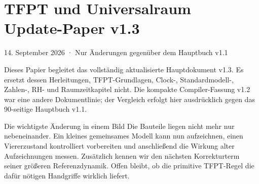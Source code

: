 \documentclass[11pt,a4paper,oneside,parskip=half,headings=normal]{scrreprt}
\begin{document}
\chapter*{TFPT und Universalraum\\Update-Paper v1.3}
\noindent\textsf{14. September 2026 · Nur Änderungen gegenüber dem Hauptbuch v1.1}

Dieses Papier begleitet das vollständig aktualisierte Hauptdokument v1.3. Es ersetzt dessen Herleitungen, TFPT-Grundlagen, Clock-, Standardmodell-, Zahlen-, RH- und Raumzeitkapitel nicht. Die kompakte Compiler-Fassung v1.2 war eine andere Dokumentlinie; der Vergleich erfolgt hier ausdrücklich gegen das 90-seitige Hauptbuch v1.1.

\begin{bild}{Die wichtigste Änderung in einem Bild}
Die Bauteile liegen nicht mehr nur nebeneinander. Ein kleines gemeinsames Modell kann nun aufzeichnen, einen Viererzustand kontrolliert vorbereiten und anschließend die Wirkung alter Aufzeichnungen messen. Zusätzlich kennen wir den nächsten Korrekturterm seiner größeren Referenzdynamik. Offen bleibt, ob die primitive TFPT-Regel die dafür nötigen Handgriffe wirklich liefert.
\end{bild}
\end{document}
